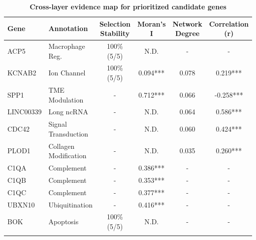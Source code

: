 \documentclass[pdflatex,sn-mathphys-num,referee,lineno]{sn-jnl}
\theoremstyle{thmstyleone}%
\theoremstyle{thmstyletwo}%
\theoremstyle{thmstylethree}%
\begin{document}
\begin{table}
    \caption{\textbf{Cross-layer evidence map for prioritized candidate genes}}\label{tab:spatial_genes}
    \scriptsize
    \begin{tabular*}{\textwidth}{@{\extracolsep\fill}llcccc}
        \toprule
        Gene & Annotation & Selection Stability & Moran's I & Network Degree & Correlation (r) \\
        \midrule
        ACP5 & Macrophage Reg. & 100\% (5/5) & N.D. & - & - \\
        KCNAB2 & Ion Channel & 100\% (5/5) & 0.094*** & 0.078 & 0.219*** \\
        SPP1 & TME Modulation & - & 0.712*** & 0.066 & -0.258*** \\
        LINC00339 & Long ncRNA & - & N.D. & 0.064 & 0.586*** \\
        CDC42 & Signal Transduction & - & N.D. & 0.060 & 0.424*** \\
        PLOD1 & Collagen Modification & - & N.D. & 0.035 & 0.260*** \\
        C1QA & Complement & - & 0.386*** & - & - \\
        C1QB & Complement & - & 0.353*** & - & - \\
        C1QC & Complement & - & 0.377*** & - & - \\
        UBXN10 & Ubiquitination & - & 0.416*** & - & - \\
        BOK & Apoptosis & 100\% (5/5) & N.D. & - & - \\
        \botrule
    \end{tabular*}
\end{table}
\end{document}
